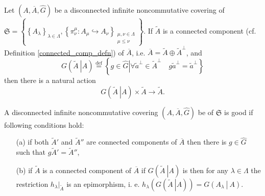 \documentclass{beamer}
\theoremstyle{plain}
\newcommand{\be}{\begin{equation}}
\newcommand{\ee}{\end{equation}}
\newcommand{\la}{\lambda}
\newcommand{\La}{\Lambda}
\newcommand{\bydef}{\stackrel{\mathrm{def}}{=}}
\newcommand{\hookto}{\hookrightarrow}        %
\begin{document}
\begin{frame}
		Let	 $\left(A, \overline{A},\widehat{G} \right)$ be a  disconnected infinite noncommutative covering of $\mathfrak{S}=\left\{\left\{A_\la\right\}_{\la\in \La}, \left\{\pi^\mu_\nu : A_\mu \hookto A_\nu\right\}_{\substack{\mu, \nu \in \La\\\mu \le \nu}}\right\}$. If $\widetilde A$ is a connected component (cf. Definition \ref{connected_comp_defn}) of $\overline{A}$, i.e. $\overline{A} = \widetilde A \oplus \widetilde A^\perp$, and
	\be\label{infinite_covering_transformation_group_eqn}
	G\left(\left.\widetilde{A}~\right| A\right)\bydef 
	\left\{\left. g \in \widehat{G}\right| \forall \widetilde a^\perp \in \widetilde A^\perp \quad g \widetilde a^\perp= \widetilde a^\perp\right\}
	\ee
	then there is a natural action
	\be\label{gta_act_eqn} 
	G\left(\left.\widetilde{A}~\right| A\right)\times \widetilde{A} \to \widetilde{A}.
	\ee
	\begin{definition}\label{good_defn}
		A  disconnected infinite noncommutative covering 	$\left(A, \overline{A},\widehat{G}\right)$ be of $\mathfrak{S}$  is \alert{good} if  following conditions hold:
		\begin{enumerate}
			\item[(a)] if both $\widetilde{A}'$ and $\widetilde{A}''$ are  {connected components} of $\overline A$ then there is  $g \in \widehat{G}$ such that $g \widetilde{A}'= \widetilde{A}''$,
			\item [(b)] if $\widetilde A$ is a   connected component of $\overline{A}$ if  $G\left(\left.\widetilde{A}~\right| A\right)$ is  then for any $\la \in \La$ the restriction $h_\la|_{\widetilde A}$ is an epimorphism, i. e. $h_\la\left(G\left(\left.\widetilde{A}~\right| A\right) \right) = G\left(\left. A_\la~\right|~A \right)$.
		\end{enumerate}
	\end{definition}

	\end{frame}
\end{document}
